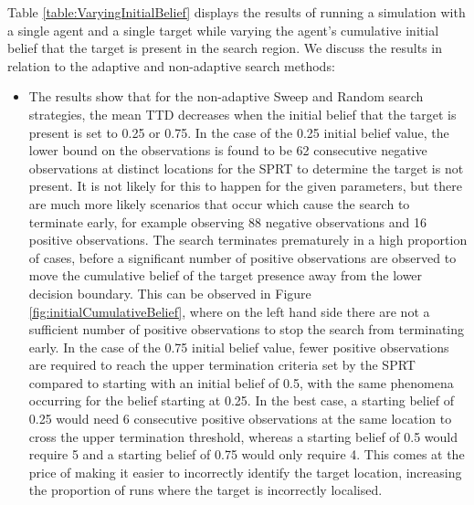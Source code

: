 Table \ref{table:VaryingInitialBelief} displays the results of running a simulation with a single agent and a single target while varying the agent's cumulative initial belief that the target is present in the search region. We discuss the results in relation to the adaptive and non-adaptive search methods:
\begin{itemize}
    \item The results show that for the non-adaptive Sweep and Random search strategies, the mean TTD decreases when the initial belief that the target is present is set to 0.25 or 0.75. In the case of the 0.25 initial belief value, the lower bound on the observations is found to be 62 consecutive negative observations at distinct locations for the SPRT to determine the target is not present. It is not likely for this to happen for the given parameters, but there are much more likely scenarios that occur which cause the search to terminate early, for example observing 88 negative observations and 16 positive observations.
    The search terminates prematurely in a high proportion of cases, before a significant number of positive observations are observed to move the cumulative belief of the target presence away from the lower decision boundary. This can be observed in Figure \ref{fig:initialCumulativeBelief}, where on the left hand side there are not a sufficient number of positive observations to stop the search from terminating early. In the case of the 0.75 initial belief value, fewer positive observations are required to reach the upper termination criteria set by the SPRT compared to starting with an initial belief of 0.5, with the same phenomena occurring for the belief starting at 0.25. In the best case, a starting belief of 0.25 would need 6 consecutive positive observations at the same location to cross the upper termination threshold, whereas a starting belief of 0.5 would  require 5 and a starting belief of 0.75 would only require 4. This comes at the price of making it easier to incorrectly identify the target location, increasing the proportion of runs where the target is incorrectly localised. 
    

\end{itemize}
